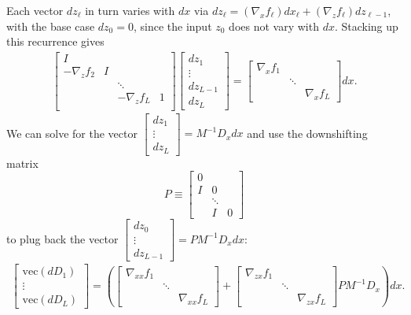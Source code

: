 \documentclass{article}
\begin{document}
Each vector $dz_\ell$ in turn varies with $dx$ via $dz_\ell = (\nabla_x f_\ell) dx_\ell + (\nabla_z f_\ell)
dz_{\ell-1}$, with the base case $dz_0 = 0$, since the input $z_0$ does not vary with $dx$. Stacking up this recurrence
gives
\begin{align}
  \begin{bmatrix}
    I             &   &                   \\
    -\nabla_z f_2 & I &                   \\
    &   & \ddots            \\
    &   & -\nabla_z f_L & 1 \\
  \end{bmatrix}
  \begin{bmatrix}
    dz_1 \\ \vdots \\ dz_{L-1}  \\ dz_L
  \end{bmatrix}
  =
  \begin{bmatrix}
    \nabla_x f_1 &        &              \\
    & \ddots &              \\
    &        & \nabla_x f_L
  \end{bmatrix}
  dx.
\end{align}
We can solve for the vector $
\begin{bmatrix}
  dz_1 \\ \vdots \\ dz_L
\end{bmatrix}
= M^{-1} D_x dx$ and use the downshifting matrix
\begin{equation}
  P \equiv
  \begin{bmatrix}
    0 \\ I & 0 \\ &\ddots \\ &I&0
  \end{bmatrix}
\end{equation}
to plug back the vector $
\begin{bmatrix}
  dz_0 \\ \vdots \\ dz_{L-1}
\end{bmatrix}
=PM^{-1}D_x dx$:
\begin{align}
  \begin{bmatrix}
    \mathrm{vec}\left(dD_1\right) \\
    \vdots                        \\
    \mathrm{vec}\left(dD_L\right)
  \end{bmatrix}
  =
  \left(
    \begin{bmatrix}
      \nabla_{xx} f_1 &        &                 \\
      & \ddots &                 \\
      &        & \nabla_{xx} f_L
    \end{bmatrix}
    +
    \begin{bmatrix}
      \nabla_{zx} f_1 \\ &\ddots& \\ &&\nabla_{zx} f_L
    \end{bmatrix}
    P M^{-1} D_x
  \right)dx.
\end{align}
\end{document}
